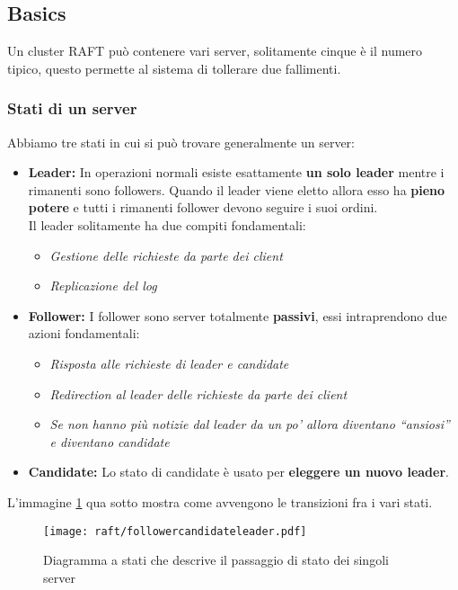 \subsection{Basics}
Un cluster RAFT può contenere vari server, solitamente cinque è il numero tipico, questo permette al sistema di tollerare due fallimenti.
  \subsubsection{Stati di un server}
  Abbiamo tre stati in cui si può trovare generalmente un server:
  \begin{itemize}
    \item{\textbf{Leader:}}
    In operazioni normali esiste esattamente \textbf{un solo leader} mentre i rimanenti sono followers. Quando il leader viene eletto allora esso ha \textbf{pieno potere} e tutti i rimanenti follower devono seguire i suoi ordini.\\
    Il leader solitamente ha due compiti fondamentali:
    \begin{itemize}
      \item{\emph{Gestione delle richieste da parte dei client}} 
      \item{\emph{Replicazione del log}}
    \end{itemize}
    \item{\textbf{Follower:}}
    I follower sono server totalmente \textbf{passivi}, essi intraprendono due azioni fondamentali: 
    \begin{itemize}
      \item{\emph{Risposta alle richieste di leader e candidate}}
      \item{\emph{Redirection al leader delle richieste da parte dei client}}
      \item{\emph{Se non hanno più notizie dal leader da un po' allora diventano ``ansiosi'' e diventano candidate}}
    \end{itemize}
    \item{\textbf{Candidate:}}
    Lo stato di candidate è usato per \textbf{eleggere un nuovo leader}.
  \end{itemize}
  L'immagine \ref{fig:figure2} qua sotto mostra come avvengono le transizioni fra i vari stati.

  \begin{figure}[H]
    \centering
    \texttt{[image: raft/followercandidateleader.pdf]}
    \caption{Diagramma a stati che descrive il passaggio di stato dei singoli server}
    \label{fig:figure2}
  \end{figure}


